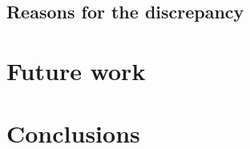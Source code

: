 \documentclass[aps,pra,superscriptaddress,reprint,nofootinbib]{revtex4-1}
\begin{document}
\subsection{Reasons for the discrepancy}





\section{Future work}
\label{sec:future_work}



\section{Conclusions}
\label{sec:conclusions}


\begin{acknowledgments}



\end{acknowledgments}


\appendix
% 


\nocite{*}


\end{document}
